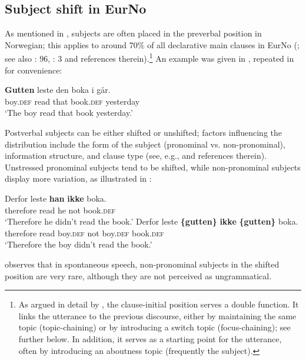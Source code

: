 \documentclass[output=paper]{langscibook}
\begin{document}
\subsection{Subject shift in EurNo}\label{sec:larsson:3.1}

As mentioned in , subjects are often placed in the preverbal position in Norwegian; this applies to around 70\% of all declarative main clauses in EurNo (\citealt{Olsen2019}; see also \citealt{WestergaardLohndal2019}: 96, \citealt{WestergaardEtAl2021}: 3 and references therein).\footnote{As argued in detail by \citet{LindahlEngdahl2022}, the clause-initial position serves a double function. It links the utterance to the previous discourse, either by maintaining the same topic (topic-chaining) or by introducing a switch topic (focus-chaining); see further  below. In addition, it serves as a starting point for the utterance, often by introducing an aboutness topic (frequently the subject).}  An example was given in , repeated in  for convenience:

\ea \label{ex:larsson:5}
\gll \textbf{Gutten} leste den boka {i går}.\\
	 boy.\textsc{def} read that book.\textsc{def} yesterday\\
\glt ‘The boy read that book yesterday.’
\z

Postverbal subjects can be either shifted or unshifted; factors influencing the distribution include the form of the subject (pronominal vs. non-pronominal), information structure, and clause type (see, e.g., \citealt{Svenonius2002, Westergaard2011, Bentzen2014a} and references therein). Unstressed pronominal subjects tend to be shifted, while non-pronominal subjects display more variation, as illustrated in :

\ea \label{ex:larsson:6}
\ea \label{ex:larsson:6a}
\gll Derfor leste \textbf{han} \textbf{ikke} boka.\\
	 therefore read he not book.\textsc{def}\\
\glt ‘Therefore he didn’t read the book.’
\ex \label{ex:larsson:6b}
\gll Derfor leste \textbf{\{gutten\}} \textbf{ikke} \textbf{\{gutten\}} boka.\\
     therefore read boy.\textsc{def} not boy.\textsc{def} book.\textsc{def}\\
\glt ‘Therefore the boy didn’t read the book.’
\z
\z

\citet{Westergaard2011} observes that in spontaneous speech, non-pronominal subjects in the shifted position  are very rare, although they are not perceived as ungrammatical. 
\end{document}
